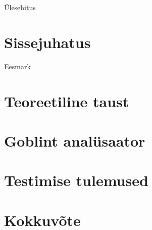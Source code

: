 \documentclass{beamer}
\title[Domeenide testimine]{\mytitle}
\subtitle[]{Bakalaureusetöö}
\author{\myauthor}
\institute[]{Tartu Ülikool, arvutiteaduse instituut}
\date{Juuni, 2018} %
\begin{document}
\frame{\titlepage}

\begin{frame}{Ülesehitus}
	\tableofcontents
\end{frame}

\section{Sissejuhatus}
\begin{frame}{Eesmärk}

\end{frame}

\section{Teoreetiline taust}
\frame{}

\section{Goblint analüsaator}
\frame{}

\section{Testimise tulemused}
\frame{}

\section{Kokkuvõte}
\frame{}
\end{document}
